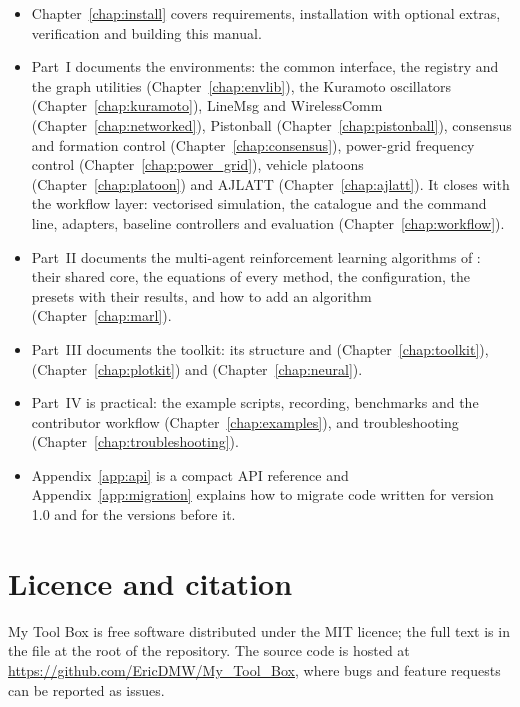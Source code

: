 \begin{itemize}
  \item Chapter~\ref{chap:install} covers requirements, installation with
    optional extras, verification and building this manual.
  \item Part~I documents the environments: the common interface, the
    registry and the graph utilities (Chapter~\ref{chap:envlib}), the
    Kuramoto oscillators (Chapter~\ref{chap:kuramoto}), LineMsg and
    WirelessComm (Chapter~\ref{chap:networked}), Pistonball
    (Chapter~\ref{chap:pistonball}), consensus and formation control
    (Chapter~\ref{chap:consensus}), power-grid frequency control
    (Chapter~\ref{chap:power_grid}), vehicle platoons
    (Chapter~\ref{chap:platoon}) and AJLATT (Chapter~\ref{chap:ajlatt}). It
    closes with the workflow layer: vectorised simulation, the catalogue and
    the command line, adapters, baseline controllers and evaluation
    (Chapter~\ref{chap:workflow}).
  \item Part~II documents the multi-agent reinforcement learning algorithms of
    : their shared core, the equations of every method,
    the configuration, the presets with their results, and how to add an
    algorithm (Chapter~\ref{chap:marl}).
  \item Part~III documents the toolkit: its structure and 
    (Chapter~\ref{chap:toolkit}),  (Chapter~\ref{chap:plotkit})
    and  (Chapter~\ref{chap:neural}).
  \item Part~IV is practical: the example scripts, recording, benchmarks and
    the contributor workflow (Chapter~\ref{chap:examples}), and
    troubleshooting (Chapter~\ref{chap:troubleshooting}).
  \item Appendix~\ref{app:api} is a compact API reference and
    Appendix~\ref{app:migration} explains how to migrate code written for
    version 1.0 and for the versions before it.
\end{itemize}

\section{Licence and citation}\label{sec:intro-licence}

My Tool Box is free software distributed under the MIT licence; the full
text is in the file  at the root of the repository. The source
code is hosted at \url{https://github.com/EricDMW/My_Tool_Box}, where bugs
and feature requests can be reported as issues.

